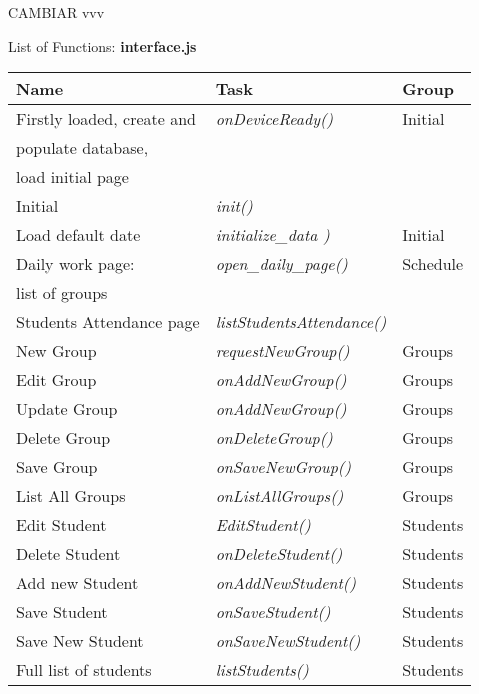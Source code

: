 {\huge  CAMBIAR vvv }
\begin{bclogo}[couleur=orange!30,logo=\bcbook, arrondi=0.1,ombre=true ] 
{List of Functions: {\bf interface.js}}	
\begin{tabular}{lll}
Name                    & Task            & Group \\
\hline
Firstly loaded, create and    & \emph{ onDeviceReady()  }& Initial\\
populate database,              &   &                       \\
load initial page               &   &                       \\
Initial                         &   \emph{ init()  } & \\
Load default date               &  \emph{ initialize\_data )      } & Initial \\
Daily work page:                &   \emph{open\_daily\_page()     } & Schedule \\
list of groups                  &                         &  \\
Students Attendance page        &  \emph{ listStudentsAttendance() }&   \\
New Group                       &  \emph{ requestNewGroup()     }   & Groups \\
Edit Group                      &  \emph{ onAddNewGroup()       }   & Groups \\
Update Group                    &  \emph{ onAddNewGroup()       }   & Groups \\
Delete Group                    &  \emph{ onDeleteGroup()       }   & Groups \\    
Save Group                      &  \emph{ onSaveNewGroup()      }   & Groups \\
List All Groups                 &  \emph{ onListAllGroups()     }   & Groups \\
Edit Student                    &  \emph{ EditStudent()         }   & Students \\
Delete Student                  &  \emph{ onDeleteStudent()     }   & Students \\   
Add new Student                 &  \emph{ onAddNewStudent()     }   & Students \\    
Save Student                    &  \emph{ onSaveStudent()       }   & Students \\
Save New Student                &  \emph{ onSaveNewStudent()    }   &  Students \\
Full list of students           &  \emph{ listStudents()        }   & Students \\

\end{tabular}
\end{bclogo}

